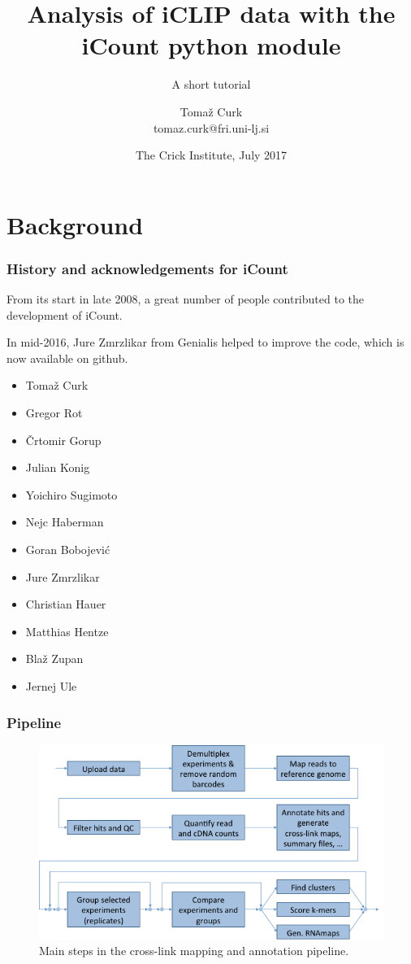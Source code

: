 \documentclass{beamer}
\title[iCLIP data analysis with iCount]
{Analysis of iCLIP data with the iCount python module}
\subtitle{
    A short tutorial
}
\author[Tomaž Curk]{
    Tomaž Curk\\
    \small{tomaz.curk@fri.uni-lj.si}
}
\institute[UL FRI]{
    University of Ljubljana\\
    Faculty of Computer and Information Science
}
\date[The Crick Institute, 14. 7. 2017]
{The Crick Institute, July 2017}
\begin{document}
\frame{\titlepage}


\section{Background}
\begin{frame}
\frametitle{History and acknowledgements for iCount}
From its start in late 2008, a great number of people contributed to the development of
iCount.

In mid-2016, Jure Zmrzlikar from Genialis helped to improve the code, which is now available on
github.

\begin{itemize}
\item Tomaž Curk
\item Gregor Rot
\item Črtomir Gorup
\item Julian Konig
\item Yoichiro Sugimoto
\item Nejc Haberman
\item Goran Bobojević
\item Jure Zmrzlikar
\item Christian Hauer
\item Matthias Hentze
\item Blaž Zupan
\item Jernej Ule
\end{itemize}
\end{frame}

\begin{frame}
\frametitle{Pipeline}

\begin{figure}
\begin{center}
    \includegraphics[width=0.85\linewidth]{images/pipeline.png}
    \caption{Main steps in the cross-link mapping and annotation pipeline.}
\end{center}
\end{figure}

\end{frame}
\end{document}
